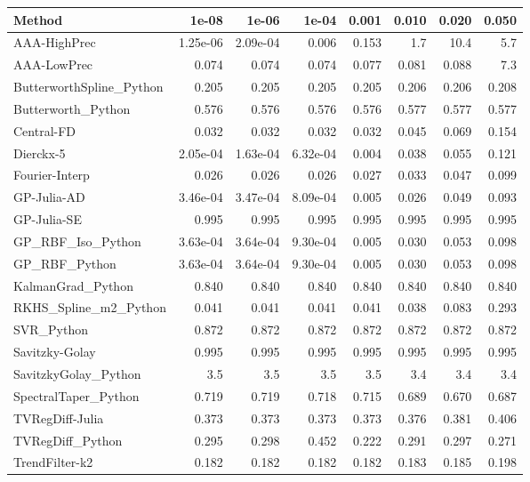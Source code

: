 \documentclass[10pt]{article}
\begin{document}
\begin{longtable}{lrrrrrrr}
\toprule
\textbf{Method} & \textbf{1e-08} & \textbf{1e-06} & \textbf{1e-04} & \textbf{0.001} & \textbf{0.010} & \textbf{0.020} & \textbf{0.050} \\
\midrule
\endhead
AAA-HighPrec & 1.25e-06 & 2.09e-04 & 0.006 & 0.153 & 1.7 & 10.4 & 5.7 \\
AAA-LowPrec & 0.074 & 0.074 & 0.074 & 0.077 & 0.081 & 0.088 & 7.3 \\
ButterworthSpline\_Python & 0.205 & 0.205 & 0.205 & 0.205 & 0.206 & 0.206 & 0.208 \\
Butterworth\_Python & 0.576 & 0.576 & 0.576 & 0.576 & 0.577 & 0.577 & 0.577 \\
Central-FD & 0.032 & 0.032 & 0.032 & 0.032 & 0.045 & 0.069 & 0.154 \\
Dierckx-5 & 2.05e-04 & 1.63e-04 & 6.32e-04 & 0.004 & 0.038 & 0.055 & 0.121 \\
Fourier-Interp & 0.026 & 0.026 & 0.026 & 0.027 & 0.033 & 0.047 & 0.099 \\
GP-Julia-AD & 3.46e-04 & 3.47e-04 & 8.09e-04 & 0.005 & 0.026 & 0.049 & 0.093 \\
GP-Julia-SE & 0.995 & 0.995 & 0.995 & 0.995 & 0.995 & 0.995 & 0.995 \\
GP\_RBF\_Iso\_Python & 3.63e-04 & 3.64e-04 & 9.30e-04 & 0.005 & 0.030 & 0.053 & 0.098 \\
GP\_RBF\_Python & 3.63e-04 & 3.64e-04 & 9.30e-04 & 0.005 & 0.030 & 0.053 & 0.098 \\
KalmanGrad\_Python & 0.840 & 0.840 & 0.840 & 0.840 & 0.840 & 0.840 & 0.840 \\
RKHS\_Spline\_m2\_Python & 0.041 & 0.041 & 0.041 & 0.041 & 0.038 & 0.083 & 0.293 \\
SVR\_Python & 0.872 & 0.872 & 0.872 & 0.872 & 0.872 & 0.872 & 0.872 \\
Savitzky-Golay & 0.995 & 0.995 & 0.995 & 0.995 & 0.995 & 0.995 & 0.995 \\
SavitzkyGolay\_Python & 3.5 & 3.5 & 3.5 & 3.5 & 3.4 & 3.4 & 3.4 \\
SpectralTaper\_Python & 0.719 & 0.719 & 0.718 & 0.715 & 0.689 & 0.670 & 0.687 \\
TVRegDiff-Julia & 0.373 & 0.373 & 0.373 & 0.373 & 0.376 & 0.381 & 0.406 \\
TVRegDiff\_Python & 0.295 & 0.298 & 0.452 & 0.222 & 0.291 & 0.297 & 0.271 \\
TrendFilter-k2 & 0.182 & 0.182 & 0.182 & 0.182 & 0.183 & 0.185 & 0.198 \\

\end{longtable}
\end{document}
